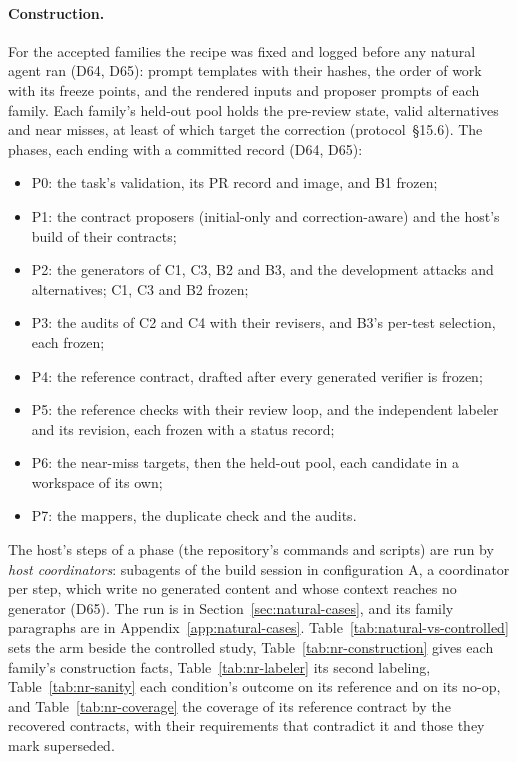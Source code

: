 \paragraph{Construction.} For the accepted families the recipe was fixed and logged before any natural agent ran (D64,
D65):  prompt templates with their hashes, the order of work with its freeze points, and the
rendered inputs and proposer prompts of each family. Each family's held-out pool holds the pre-review state,
 valid alternatives and  near misses, at least
 of which target the correction (protocol~\S15.6). The phases, each ending with a committed record (D64, D65):
\begin{itemize}
\item P0: the task's validation, its PR record and image, and B1 frozen;
\item P1: the contract proposers (initial-only and correction-aware) and the host's build of their contracts;
\item P2: the generators of C1, C3, B2 and B3, and the development attacks and alternatives; C1, C3 and B2 frozen;
\item P3: the audits of C2 and C4 with their revisers, and B3's per-test selection, each frozen;
\item P4: the reference contract, drafted after every generated verifier is frozen;
\item P5: the reference checks with their review loop, and the independent labeler and its revision, each frozen with a
  status record;
\item P6: the near-miss targets, then the held-out pool, each candidate in a workspace of its own;
\item P7: the mappers, the duplicate check and the audits.
\end{itemize}
The host's steps of a phase (the repository's commands and scripts) are run by \emph{host coordinators}: subagents of the
build session in configuration A, a coordinator per step, which write no generated content and whose context
reaches no generator (D65). The run is in Section~\ref{sec:natural-cases}, and its family paragraphs are in
Appendix~\ref{app:natural-cases}. Table~\ref{tab:natural-vs-controlled} sets the arm beside the controlled study,
Table~\ref{tab:nr-construction} gives each family's construction facts, Table~\ref{tab:nr-labeler} its second
labeling, Table~\ref{tab:nr-sanity} each condition's outcome on its reference and on its no-op, and
Table~\ref{tab:nr-coverage} the coverage of its reference contract by the recovered contracts, with their
requirements that contradict it and those they mark superseded.

